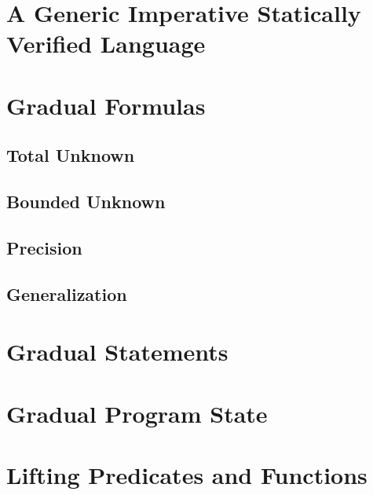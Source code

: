 \section{A Generic Imperative Statically Verified Language \svl}
\label{sec:a-statically-verified}


\section{Gradual Formulas}
\label{sec:gradual-formulas}


    \subsection{Total Unknown}
    \label{ssec:dedicated-wildcard-formula}
    
    
    \subsection{Bounded Unknown}
    \label{ssec:wildcard-with-upper}
    

    \subsection{Precision}
    \label{ssec:precision}
    
    
    \subsection{Generalization}
    \label{ssec:generalization}
    
    
\section{Gradual Statements}
\label{sec:gradual-statements}


\section{Gradual Program State}
\label{sec:gradual-program-state}


\section{Lifting Predicates and Functions}
\label{sec:lifting-predicates-and}


